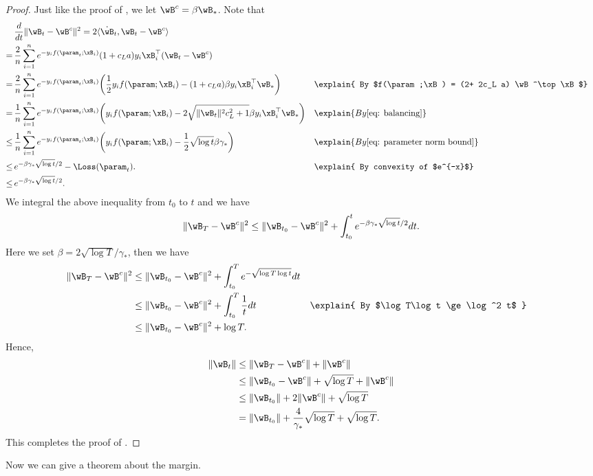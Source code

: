 \begin{proof}
Just like the proof of ,
we let $\wB^c = \beta \wB_*$. Note that 
\begin{align*}
    &\frac{d}{dt} \| \wB_t - \wB^c\|^2 =  2 \langle \dot \wB_t, \wB_t - \wB^c \rangle \\ 
    = \, & \frac{2}{n} \sum_{i=1}^n e^{-y_i f(\param_t;\xB_i)} (1+ c_L a)y_i \xB_i^\top (\wB_t - \wB^c) \\ 
    = \, & \frac{2}{n} \sum_{i=1}^n e^{-y_i f(\param_t;\xB_i)} \bigg( \frac{1}{2} y_i f(\param;\xB_i) -  (1+c_L a) \beta y_i \xB_i^\top \wB_* \bigg) &&\explain{ By $f(\param;\xB) = (2+ 2c_L a) \wB^\top \xB$}\\ 
    = \, & \frac{1}{n}\sum_{i=1}^n e^{-y_i f(\param_t;\xB_i)} \bigg(  y_i f(\param;\xB_i) -  2 \sqrt{\|\wB_t\|^2 c_L^2 + 1}  \beta y_i \xB_i^\top \wB_* \bigg) &&\explain{ By \Cref{eq: balancing}}  \\ 
    \le \, & \frac{1}{n}\sum_{i=1}^n e^{-y_i f(\param_t;\xB_i)} \bigg(  y_i f(\param;\xB_i) -  \frac{1}{2} \sqrt{\log t}  \beta \gamma_* \bigg) &&\explain{ By \Cref{eq: parameter norm bound}  }\\ 
    \le \, & e^{- \beta \gamma_* \sqrt{\log t} / 2} - \Loss (\param_t).  &&\explain{ By convexity of  $e^{-x}$}\\ 
    \le \, & e^{- \beta \gamma_* \sqrt{\log t} / 2}. 
\end{align*}
 We integral the above inequality from $t_0$ to $t$ and we have
\[
    \|\wB_T- \wB^c\|^2 \le \|\wB_{t_0} - \wB^c\|^2  + \int_{t_0}^t e^{- \beta \gamma_* \sqrt{\log t} / 2} dt.
\] 
Here we set $\beta = 2\sqrt{ \log T}/\gamma_*$, then we have  
\begin{align*}
        \|\wB_{T}- \wB^c\|^2  
        &\le \|\wB_{t_0} - \wB^c\|^2  + \int_{t_0}^T e^{- \sqrt{\log T \log t} } dt\\ 
        &\le \|\wB_{t_0} - \wB^c\|^2  + \int_{t_0}^T  \frac{1}{t} dt &&\explain{ By $\log T\log t \ge \log^2 t$ } \\ 
        &\le \|\wB_{t_0} - \wB^c\|^2 + \log T. 
\end{align*}
Hence, 
\begin{align*}
        \|\wB_t\|
        &\le \|\wB_T- \wB^c\|  + \|\wB^c\| \\ 
        &\le \|\wB_{t_0} - \wB^c\| + \sqrt{ \log T}  + \|\wB^c\| \\ 
        & \le \|\wB_{t_0}\| + 2 \|\wB^c\| + \sqrt{ \log T}\\ 
        & = \|\wB_{t_0}\| + \frac{4}{\gamma_*} \sqrt{\log T}  + \sqrt{ \log T}.  
\end{align*}
This completes the proof of .
\end{proof}
Now we can give a theorem about the margin. 
